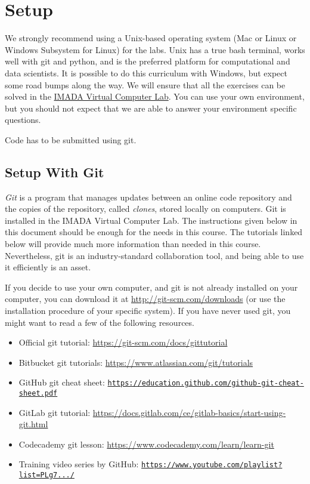 \newpage
\section*{Setup} %

\begin{warn}
We strongly recommend using a Unix-based operating system (Mac or Linux or Windows Subsystem for Linux) for the labs.
Unix has a true bash terminal, works well with git and python, and is the preferred platform for computational and data scientists.
It is possible to do this curriculum with Windows, but expect some road bumps along the way. We will ensure that all the exercises can be solved in the \href{https://imada.sdu.dk/u/jlandersen/imada/it/complab.html}{IMADA Virtual Computer Lab}. 
You can use your own environment, but you should not expect that we are able to answer your environment specific questions.
\end{warn}

Code has to be submitted using git. 

\subsection*{Setup With Git} %

\emph{Git} is a program that manages updates between an online code
repository and the copies of the repository, called \emph{clones},
stored locally on computers. Git is installed in the IMADA Virtual Computer
Lab. The instructions given below in this document should be enough for
the needs in this course. The tutorials linked below will provide much
more information than needed in this course. Nevertheless, git is an industry-standard collaboration tool, and being able to use it efficiently is an asset.

If you decide to use your own computer, and git is not already installed on your computer, you can download it at \url{http://git-scm.com/downloads} (or use the installation procedure of your specific system).
If you have never used git, you might want to read a few of the following resources.
\begin{itemize}
\item Official git tutorial: \url{https://git-scm.com/docs/gittutorial}
\item Bitbucket git tutorials: \url{https://www.atlassian.com/git/tutorials}
\item GitHub git cheat sheet: \href{https://education.github.com/git-cheat-sheet-education.pdf}{\texttt{https://education.github.com/github-git-cheat-sheet.pdf}}
\item GitLab git tutorial: \url{https://docs.gitlab.com/ce/gitlab-basics/start-using-git.html}
\item Codecademy git lesson: \url{https://www.codecademy.com/learn/learn-git}
\item Training video series by GitHub: \href{https://www.youtube.com/playlist?list=PLg7s6cbtAD15G8lNyoaYDuKZSKyJrgwB-}{\texttt{https://www.youtube.com/playlist?list=PLg7.../}}
\end{itemize}

